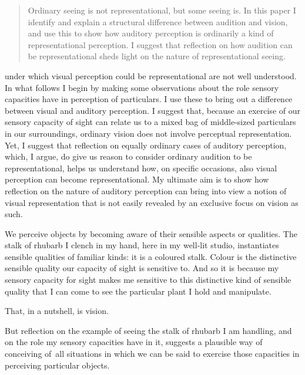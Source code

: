 \documentclass[sloppy, journal, bytitle, dodraft]{humapap}
\begin{document}
\documenttitle

\begin{abstract}  Ordinary seeing is not representational, but some seeing is. In this paper I identify and explain a structural difference between audition and vision, and use this to show how auditory perception is ordinarily a kind of  representational perception. I suggest that reflection on how audition can be representational  sheds light on the nature of representational seeing. \end{abstract}

 under which visual perception could be representational are not well understood. In what follows I begin by making some observations about the role sensory capacities have in perception of particulars. I use these to bring out a difference between visual and auditory perception. I suggest that, because an exercise of our sensory capacity of sight can relate us to a mixed bag of middle-sized particulars in our surroundings, ordinary vision does not involve perceptual representation. Yet, I suggest that reflection on equally ordinary cases of auditory perception, which, I argue, do give us reason to consider ordinary audition to be representational, helps us understand how, on specific occasions, also visual perception can become representational. My ultimate aim is to show how reflection on the nature of auditory perception can bring into view a notion of visual representation that is not easily revealed by an exclusive focus on vision as such.

\sect We perceive objects by becoming aware of their sensible aspects or qualities. The stalk of rhubarb I clench in my hand, here in my well-lit studio, instantiates sensible qualities of familiar kinds: it is a coloured stalk. Colour is the distinctive sensible quality our capacity of sight is sensitive to. And so it is because my sensory capacity for sight makes me sensitive to this distinctive kind of sensible quality that I can come to see the particular plant I hold and manipulate. 

That, in a nutshell, is vision. 

But reflection on the example of seeing the stalk of rhubarb I am handling, and on the role my sensory capacities have in it, suggests a plausible way of conceiving of all situations in which we can be said to exercise those capacities in perceiving particular objects.
 
\end{document}
